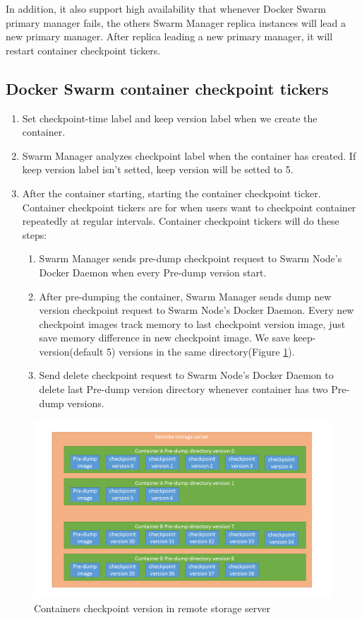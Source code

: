 In addition, it also support high availability that whenever Docker Swarm primary manager fails, the others Swarm Manager replica instances will lead a new primary manager. After replica leading a new primary manager, it will restart container checkpoint tickers.

\subsection{Docker Swarm container checkpoint tickers}
\begin{enumerate}[Step 1.]
	\item Set checkpoint-time label and keep version label when we create the container.
    \item Swarm Manager analyzes checkpoint label when the container has created. If keep version label isn't setted, keep version will be setted to 5.
    \item After the container starting, starting the container checkpoint ticker. Container checkpoint tickers are for when users want to checkpoint container repeatedly at regular intervals. Container checkpoint tickers will do these steps:
    \begin{enumerate}[Step a.]
    \item Swarm Manager sends pre-dump checkpoint request to Swarm Node's Docker Daemon when every Pre-dump version start.
    \item After pre-dumping the container, Swarm Manager sends dump new version checkpoint request to Swarm Node's Docker Daemon. Every new checkpoint images track memory to last checkpoint version image, just save memory difference in new checkpoint image. We save keep-version(default 5) versions in the same directory(Figure \ref{fig:Containers checkpoint versions in remote storage server}).
    \item Send delete checkpoint request to Swarm Node's Docker Daemon to delete last Pre-dump version directory whenever container has two Pre-dump versions.
    \end{enumerate}
\end{enumerate}
\begin{figure}[h]
\begin{center}
\includegraphics[width=15cm]{figure/checkpoint_demo.png}
\end{center}
\caption{Containers checkpoint version in remote storage server}
\label{fig:Containers checkpoint versions in remote storage server}
\end{figure}
